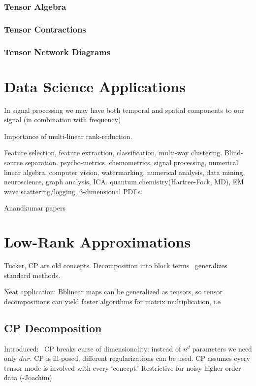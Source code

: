 \documentclass[10pt]{article}
\begin{document}
\subsubsection{Tensor Algebra}
\subsubsection{Tensor Contractions}
\subsubsection{Tensor Network Diagrams}

\section{Data Science Applications}
In signal processing we may have both temporal and spatial components to our signal (in combination with frequency)

Importance of multi-linear rank-reduction.

Feature selection, feature extraction, classification, multi-way clustering.
Blind-source separation. 
psycho-metrics, chemometrics, signal processing, numerical linear algebra, computer vision, watermarking, numerical analysis, data mining, neuroscience, graph analysis, ICA.
quantum chemistry(Hartree-Fock, MD), EM wave scattering/logging. 3-dimensional PDEs. 

Anandkumar papers~\cite{Anandk}
\section{Low-Rank Approximations}

Tucker, CP are old concepts. Decomposition into block terms~\cite{Lathauwer08decompositionsof} generalizes standard methods.

Neat application: Bblinear maps can be generalized as tensors, so tensor decompositions can yield faster algorithms for matrix multiplication, i.e~\cite{Benson}

\subsection{CP Decomposition}
Introduced:~\cite{hitchcock-sum-1927}
CP breaks curse of dimensionality: instead of $n^d$ parameters we need only $dnr$.
CP is ill-posed, different regularizations can be used.
CP assumes every tensor mode is involved with every `concept.' Restrictive for noisy higher order data (-Joachim)
\end{document}
